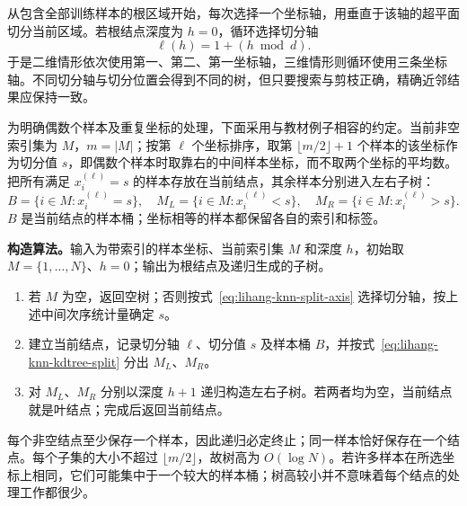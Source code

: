 从包含全部训练样本的根区域开始，每次选择一个坐标轴，用垂直于该轴的超平面切分当前区域。若根结点深度为 $h=0$，循环选择切分轴
\begin{equation}
  \ell(h)=1+(h\bmod d).
  \label{eq:lihang-knn-split-axis}
\end{equation}
于是二维情形依次使用第一、第二、第一坐标轴，三维情形则循环使用三条坐标轴。不同切分轴与切分位置会得到不同的树，但只要搜索与剪枝正确，精确近邻结果应保持一致。

为明确偶数个样本及重复坐标的处理，下面采用与教材例子相容的约定。当前非空索引集为 $M$，$m=|M|$；按第 $\ell$ 个坐标排序，取第 $\lfloor m/2\rfloor+1$ 个样本的该坐标作为切分值 $s$，即偶数个样本时取靠右的中间样本坐标，而不取两个坐标的平均数。把所有满足 $x_i^{(\ell)}=s$ 的样本存放在当前结点，其余样本分别进入左右子树：
\begin{equation}
  B=\{i\in M:x_i^{(\ell)}=s\},\quad
  M_L=\{i\in M:x_i^{(\ell)}<s\},\quad
  M_R=\{i\in M:x_i^{(\ell)}>s\}.
  \label{eq:lihang-knn-kdtree-split}
\end{equation}
$B$ 是当前结点的样本桶；坐标相等的样本都保留各自的索引和标签。

\textbf{构造算法。}输入为带索引的样本坐标、当前索引集 $M$ 和深度 $h$，初始取 $M=\{1,\ldots,N\}$、$h=0$；输出为根结点及递归生成的子树。
\begin{enumerate}
  \item 若 $M$ 为空，返回空树；否则按式~\eqref{eq:lihang-knn-split-axis} 选择切分轴，按上述中间次序统计量确定 $s$。
  \item 建立当前结点，记录切分轴 $\ell$、切分值 $s$ 及样本桶 $B$，并按式~\eqref{eq:lihang-knn-kdtree-split} 分出 $M_L$、$M_R$。
  \item 对 $M_L$、$M_R$ 分别以深度 $h+1$ 递归构造左右子树。若两者均为空，当前结点就是叶结点；完成后返回当前结点。
\end{enumerate}
每个非空结点至少保存一个样本，因此递归必定终止；同一样本恰好保存在一个结点。每个子集的大小不超过 $\lfloor m/2\rfloor$，故树高为 $O(\log N)$。若许多样本在所选坐标上相同，它们可能集中于一个较大的样本桶；树高较小并不意味着每个结点的处理工作都很少。

